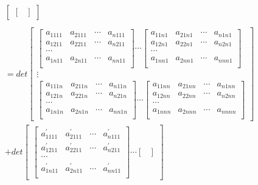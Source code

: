 \documentclass[twoside,a4paper,CCT]{cctart}   %
\begin{document}
\begin{list}{}
\begin{align*}
\begin{bmatrix}
\begin{bmatrix}
\end{bmatrix}
\end{bmatrix}\\
\\
=det\begin{bmatrix}
 \begin{bmatrix}
   a_{1111}& a_{2111}&\cdots&a_{n111}\\
   a_{1211}& a_{2211}&\cdots&a_{n211}\\
 \cdots\\
a_{1n11}& a_{2n11}&\cdots&a_{nn11}\\
\end{bmatrix}
\cdots
\begin{bmatrix}
  a_{11n1}& a_{21n1}&\cdots&a_{n1n1}\\
  a_{12n1}& a_{22n1}&\cdots&a_{n2n1}\\
 \cdots\\
 a_{1nn1}& a_{2nn1}&\cdots&a_{nnn1}\\
 \end{bmatrix}\\
\vdots\\
\begin{bmatrix}
  a_{111n}& a_{211n}&\cdots&a_{n11n}\\
  a_{121n}& a_{221n}&\cdots&a_{n21n}\\
   \cdots\\
   a_{1n1n}& a_{2n1n}&\cdots&a_{nn1n}\\
   \end{bmatrix}
\cdots
\begin{bmatrix}
  a_{11nn}& a_{21nn}&\cdots&a_{n1nn}\\
  a_{12nn}& a_{22nn}&\cdots&a_{n2nn}\\
   \cdots\\
   a_{1nnn}& a_{2nnn}&\cdots&a_{nnnn}\\
   \end{bmatrix}
    \end{bmatrix}
  \\+det
  \begin{bmatrix}
 \begin{bmatrix}
   a_{1111}^{'}& a_{2111}^{'}&\cdots&a_{n111}^{'}\\
   a_{1211}^{'}& a_{2211}^{'}&\cdots&a_{n211}^{'}\\
 \cdots\\
a_{1n11}^{'}& a_{2n11}^{'}&\cdots&a_{nn11}^{'}\\
\end{bmatrix}
\cdots
\begin{bmatrix}

\end{bmatrix}
\end{bmatrix}
\end{align*}
\end{list}
\end{document}
